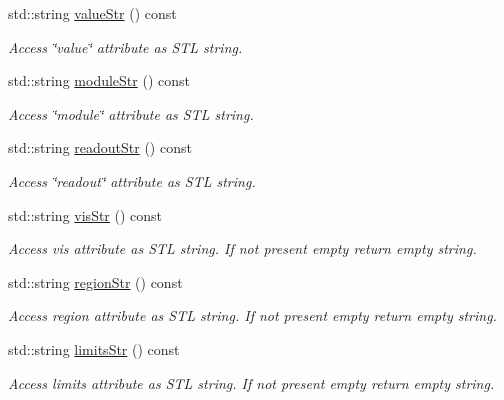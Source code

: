 \begin{DoxyCompactItemize}
std::string \hyperlink{struct_d_d4hep_1_1_x_m_l_1_1_child_value_ab97b87abcbe2f6d3857b0ef2de082193}{valueStr} () const 
\begin{DoxyCompactList}\small\item\em Access \char`\"{}value\char`\"{} attribute as STL string. \item\end{DoxyCompactList}\item 
std::string \hyperlink{struct_d_d4hep_1_1_x_m_l_1_1_child_value_a37d7e7fc7f3bba7c2ce598dc1599417f}{moduleStr} () const 
\begin{DoxyCompactList}\small\item\em Access \char`\"{}module\char`\"{} attribute as STL string. \item\end{DoxyCompactList}\item 
std::string \hyperlink{struct_d_d4hep_1_1_x_m_l_1_1_child_value_af46ff62859f4902bd9f80aa78080a8d7}{readoutStr} () const 
\begin{DoxyCompactList}\small\item\em Access \char`\"{}readout\char`\"{} attribute as STL string. \item\end{DoxyCompactList}\item 
std::string \hyperlink{struct_d_d4hep_1_1_x_m_l_1_1_child_value_a2df3ef6ebddc522172e9397cf4459a3d}{visStr} () const 
\begin{DoxyCompactList}\small\item\em Access vis attribute as STL string. If not present empty return empty string. \item\end{DoxyCompactList}\item 
std::string \hyperlink{struct_d_d4hep_1_1_x_m_l_1_1_child_value_a3ede8fa402040bee29b63eebff108349}{regionStr} () const 
\begin{DoxyCompactList}\small\item\em Access region attribute as STL string. If not present empty return empty string. \item\end{DoxyCompactList}\item 
std::string \hyperlink{struct_d_d4hep_1_1_x_m_l_1_1_child_value_a6aa93ecd3599cb12e8d455173d5a9d79}{limitsStr} () const 
\begin{DoxyCompactList}\small\item\em Access limits attribute as STL string. If not present empty return empty string. \item\end{DoxyCompactList}\end{DoxyCompactItemize}


